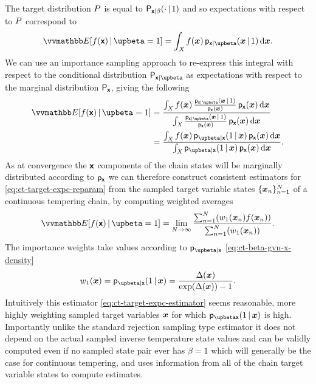 The target distribution $P$ is equal to $\mathsf{P}_{\boldsymbol{\mathsf{x}}|\beta}(\cdot \operatorname{|} 1)$ and so expectations with respect to $P$ correspond to
\begin{equation}
\expc{f(\rvct{x})\gvn\upbeta=1} =
\int_{\set{X}} f(\vct{x})\,\pden{\rvct{x}|\upbeta}(\vct{x}\gvn 1)\,\dr\vct{x}.
\end{equation}
We can use an importance sampling approach to re-express this integral with respect to the conditional distribution $\prob{\rvct{x}|\upbeta}$ as expectations with respect to the marginal distribution $\mathsf{P}_{\boldsymbol{\mathsf{x}}}$, giving the following
\begin{align}
\expc{f(\rvct{x})\gvn\upbeta=1} &=
\frac{
  \int_{\set{X}} 
    f(\vct{x})\, \frac{\pden{\rvct{x}|\upbeta}(\vct{x}\gvn 1)}{\pden{\rvct{x}}(\vct{x})} \, \pden{\rvct{x}}(\vct{x})
  \,\dr\vct{x}
}{
  \int_{\set{X}} 
    \frac{\pden{\rvct{x}|\upbeta}(\vct{x} \gvn 1)}{\pden{\rvct{x}}(\vct{x})} \, \pden{\rvct{x}}(\vct{x})
  \,\dr\vct{x}
} \\ \label{eq:ct-target-expc-reparam}
&=
\frac{
  \int_{\set{X}} 
    f(\vct{x})\, \pden{\upbeta|\rvct{x}}(1 \gvn \vct{x}) \, \pden{\rvct{x}}(\vct{x})
  \,\dr\vct{x}
}{
  \int_{\set{X}} 
    \pden{\upbeta|\rvct{x}}(1 \gvn \vct{x}) \, \pden{\rvct{x}}(\vct{x})
  \,\dr\vct{x}
} .
\end{align}
As at convergence the $\boldsymbol{\mathsf{x}}$ components of the chain states will be marginally distributed according to $\mathsf{p}_{\boldsymbol{\mathsf{x}}}$ we can therefore construct consistent estimators for \eqref{eq:ct-target-expc-reparam} from the sampled target variable states $\lbrace \boldsymbol{x}_n \rbrace_{n=1}^N$ of a continuous tempering chain, by computing weighted averages
\begin{equation}\label{eq:ct-target-expc-estimator}
\expc{f(\rvct{x})\gvn\upbeta=1} =
\lim_{N \to \infty}
\frac
{\sum_{n=1}^N \lpa w_1\lpa \vct{x}_n\rpa f\lpa\vct{x}_n\rpa\rpa}
{\sum_{n=1}^N\lpa w_1\lpa \vct{x}_n\rpa \rpa}.
\end{equation}
The importance weights take values according to $\pden{\upbeta|\rvct{x}}$ \eqref{eq:ct-beta-gvn-x-density}
\begin{equation}\label{eq:ct-target-expc-estimator-importance-weight}
w_1(\vct{x}) = \pden{\upbeta|\rvct{x}}(1 \gvn \vct{x}) = \frac{\Delta(\vct{x})}{\exp\lpa\Delta(\vct{x})\rpa - 1}.
\end{equation}
Intuitively this estimator \eqref{eq:ct-target-expc-estimator} seems reasonable, more highly weighting sampled target variables $\boldsymbol{x}$ for which $\pden{\upbeta \rvct{x}}(1 \gvn \vct{x})$ is high. Importantly unlike the standard rejection sampling type estimator it does not depend on the actual sampled inverse temperature state values and can be validly computed even if no sampled state pair ever has $\beta = 1$ which will generally be the case for continuous tempering, and uses information from all of the chain target variable states to compute estimates.

